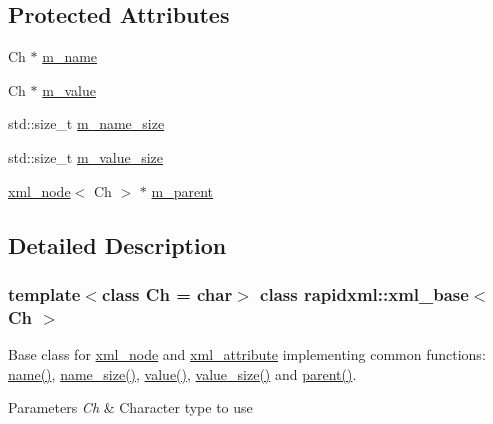 \subsection*{Protected Attributes}
\begin{DoxyCompactItemize}
\item 
Ch $\ast$ \mbox{\hyperlink{classrapidxml_1_1xml__base_afd9851ed43e14619db0d7075ef8e9e8a}{m\+\_\+name}}
\item 
Ch $\ast$ \mbox{\hyperlink{classrapidxml_1_1xml__base_a278a1ea63b0b70219b946cec47fa00ea}{m\+\_\+value}}
\item 
std\+::size\+\_\+t \mbox{\hyperlink{classrapidxml_1_1xml__base_a5a8c76a7274b4180213796422c4df76f}{m\+\_\+name\+\_\+size}}
\item 
std\+::size\+\_\+t \mbox{\hyperlink{classrapidxml_1_1xml__base_aa3a49d8ceddb8a8d7edb773a2226b89c}{m\+\_\+value\+\_\+size}}
\item 
\mbox{\hyperlink{classrapidxml_1_1xml__node}{xml\+\_\+node}}$<$ Ch $>$ $\ast$ \mbox{\hyperlink{classrapidxml_1_1xml__base_a90d5f660f078f66563fd7b2d8387ccb0}{m\+\_\+parent}}
\end{DoxyCompactItemize}


\subsection{Detailed Description}
\subsubsection*{template$<$class Ch = char$>$\newline
class rapidxml\+::xml\+\_\+base$<$ Ch $>$}

Base class for \mbox{\hyperlink{classrapidxml_1_1xml__node}{xml\+\_\+node}} and \mbox{\hyperlink{classrapidxml_1_1xml__attribute}{xml\+\_\+attribute}} implementing common functions\+: \mbox{\hyperlink{classrapidxml_1_1xml__base_aef8ae147fbee59209f714274afc80dc4}{name()}}, \mbox{\hyperlink{classrapidxml_1_1xml__base_a20c8ffbe0c7a0b4231681ab8b99330a4}{name\+\_\+size()}}, \mbox{\hyperlink{classrapidxml_1_1xml__base_a6af65de5e59ac497cd69838f8a89d602}{value()}}, \mbox{\hyperlink{classrapidxml_1_1xml__base_a2eb123d471b1567fa4832b6ee2b75493}{value\+\_\+size()}} and \mbox{\hyperlink{classrapidxml_1_1xml__base_aa807062868d671a8c798d9d1bf016988}{parent()}}. 
\begin{DoxyParams}{Parameters}
{\em Ch} & Character type to use \\
\hline
\end{DoxyParams}


